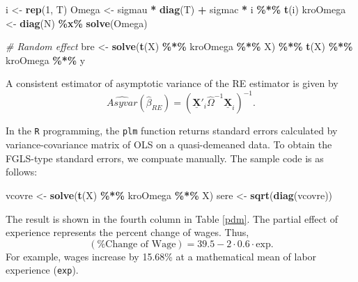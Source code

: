 \documentclass[
  12pt,
]{article}
\newenvironment{Shaded}{\begin{snugshade}}{\end{snugshade}}
\newcommand{\CommentTok}[1]{\textcolor[rgb]{0.56,0.35,0.01}{\textit{#1}}}
\newcommand{\DecValTok}[1]{\textcolor[rgb]{0.00,0.00,0.81}{#1}}
\newcommand{\KeywordTok}[1]{\textcolor[rgb]{0.13,0.29,0.53}{\textbf{#1}}}
\newcommand{\NormalTok}[1]{#1}
\newcommand{\OperatorTok}[1]{\textcolor[rgb]{0.81,0.36,0.00}{\textbf{#1}}}
\newcommand{\StringTok}[1]{\textcolor[rgb]{0.31,0.60,0.02}{#1}}
\begin{document}
\begin{Shaded}
\begin{Highlighting}[]
\NormalTok{i \textless{}{-}}\StringTok{ }\KeywordTok{rep}\NormalTok{(}\DecValTok{1}\NormalTok{, T)}
\NormalTok{Omega \textless{}{-}}\StringTok{ }\NormalTok{sigmau }\OperatorTok{*}\StringTok{ }\KeywordTok{diag}\NormalTok{(T) }\OperatorTok{+}\StringTok{ }\NormalTok{sigmac }\OperatorTok{*}\StringTok{ }\NormalTok{i }\OperatorTok{\%*\%}\StringTok{ }\KeywordTok{t}\NormalTok{(i)}
\NormalTok{kroOmega \textless{}{-}}\StringTok{ }\KeywordTok{diag}\NormalTok{(N) }\OperatorTok{\%x\%}\StringTok{ }\KeywordTok{solve}\NormalTok{(Omega)}

\CommentTok{\# Random effect}
\NormalTok{bre \textless{}{-}}\StringTok{ }\KeywordTok{solve}\NormalTok{(}\KeywordTok{t}\NormalTok{(X) }\OperatorTok{\%*\%}\StringTok{ }\NormalTok{kroOmega }\OperatorTok{\%*\%}\StringTok{ }\NormalTok{X) }\OperatorTok{\%*\%}\StringTok{ }\KeywordTok{t}\NormalTok{(X) }\OperatorTok{\%*\%}\StringTok{ }\NormalTok{kroOmega }\OperatorTok{\%*\%}\StringTok{ }\NormalTok{y}
\end{Highlighting}
\end{Shaded}

A consistent estimator of asymptotic variance of the RE estimator is given by
\[
  \widehat{Asyvar}(\hat{\beta}_{RE}) = 
  \left( \underline{\mathbf{X}}'_i \hat{\Omega}^{-1} \underline{\mathbf{X}}_i \right)^{-1}.
\]

In the \texttt{R} programming,
the \texttt{plm} function returns standard errors
calculated by variance-covariance matrix of OLS on a quasi-demeaned data.
To obtain the FGLS-type standard errors, we compuate manually.
The sample code is as follows:

\begin{Shaded}
\begin{Highlighting}[]
\NormalTok{vcovre \textless{}{-}}\StringTok{ }\KeywordTok{solve}\NormalTok{(}\KeywordTok{t}\NormalTok{(X) }\OperatorTok{\%*\%}\StringTok{ }\NormalTok{kroOmega }\OperatorTok{\%*\%}\StringTok{ }\NormalTok{X)}
\NormalTok{sere \textless{}{-}}\StringTok{ }\KeywordTok{sqrt}\NormalTok{(}\KeywordTok{diag}\NormalTok{(vcovre))}
\end{Highlighting}
\end{Shaded}

The result is shown in the fourth column in Table \ref{pdm}.
The partial effect of experience represents the percent change of wages.
Thus,
\[
  (\text{\% Change of Wage}) = 39.5 - 2 \cdot 0.6 \cdot \text{exp}.
\]
For example, wages increase by 15.68\% at a mathematical mean of labor experience (\texttt{exp}).
\end{document}
